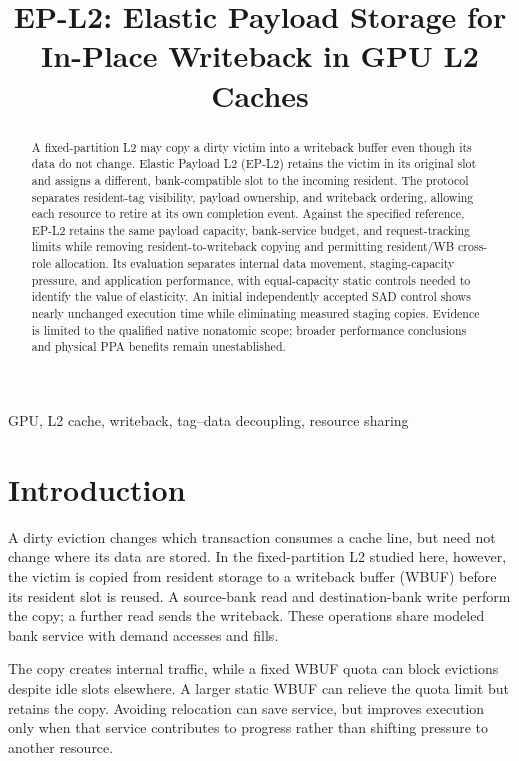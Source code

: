 \documentclass[conference,letterpaper]{IEEEtran}
\begin{document}
\title{EP-L2: Elastic Payload Storage for\\In-Place Writeback in GPU L2 Caches}
\author{}
\maketitle
\begin{abstract}
A fixed-partition L2 may copy a dirty victim into a writeback buffer even though its data do not change. Elastic Payload L2 (EP-L2) retains the victim in its original slot and assigns a different, bank-compatible slot to the incoming resident. The protocol separates resident-tag visibility, payload ownership, and writeback ordering, allowing each resource to retire at its own completion event. Against the specified reference, EP-L2 retains the same payload capacity, bank-service budget, and request-tracking limits while removing resident-to-writeback copying and permitting resident/WB cross-role allocation. Its evaluation separates internal data movement, staging-capacity pressure, and application performance, with equal-capacity static controls needed to identify the value of elasticity. An initial independently accepted SAD control shows nearly unchanged execution time while eliminating measured staging copies. Evidence is limited to the qualified native nonatomic scope; broader performance conclusions and physical PPA benefits remain unestablished.
\end{abstract}
\begin{IEEEkeywords}
GPU, L2 cache, writeback, tag--data decoupling, resource sharing
\end{IEEEkeywords}

\section{Introduction}
A dirty eviction changes which transaction consumes a cache line, but need not change where its data are stored. In the fixed-partition L2 studied here, however, the victim is copied from resident storage to a writeback buffer (WBUF) before its resident slot is reused. A source-bank read and destination-bank write perform the copy; a further read sends the writeback. These operations share modeled bank service with demand accesses and fills.

The copy creates internal traffic, while a fixed WBUF quota can block evictions despite idle slots elsewhere. A larger static WBUF can relieve the quota limit but retains the copy. Avoiding relocation can save service, but improves execution only when that service contributes to progress rather than shifting pressure to another resource.
\end{document}
